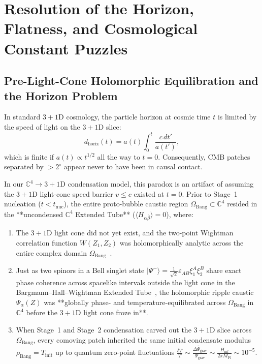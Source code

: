 \documentclass[11pt,a4paper]{article}
\begin{document}
\section{Resolution of the Horizon, Flatness, and Cosmological Constant Puzzles}

\subsection{Pre-Light-Cone Holomorphic Equilibration and the Horizon Problem}
In standard $3+1\text{D}$ cosmology, the particle horizon at cosmic time $t$ is limited by the speed of light on the $3+1\text{D}$ slice:
\begin{equation}
d_{\text{horiz}}(t) = a(t) \int_0^t \frac{c\, dt'}{a(t')},
\end{equation}
which is finite if $a(t) \propto t^{1/2}$ all the way to $t = 0$. Consequently, CMB patches separated by $> 2^\circ$ appear never to have been in causal contact.

In our $\mathbb{C}^4 \to 3+1\text{D}$ condensation model, this paradox is an artifact of assuming the $3+1\text{D}$ light-cone speed barrier $v \le c$ existed at $t = 0$. Prior to Stage~1 nucleation ($t < t_{\text{nuc}}$), the entire proto-bubble caustic region $\Omega_{\text{Bang}} \subset \mathbb{C}^4$ resided in the **uncondensed $\mathbb{C}^4$ Extended Tube** ($\langle H_{\alpha\bar{\beta}}\rangle = 0$), where:
\begin{enumerate}
    \item The $3+1\text{D}$ light cone did not yet exist, and the two-point Wightman correlation function $W(Z_1, Z_2)$ was holomorphically analytic across the entire complex domain $\Omega_{\text{Bang}}$~\cite{StreaterWightman1964}.
    \item Just as two spinors in a Bell singlet state $|\Psi^-\rangle = \frac{1}{\sqrt{2}}\varepsilon_{AB}\xi_1^A\xi_2^B$ share exact phase coherence across spacelike intervals outside the light cone in the Bargmann--Hall--Wightman Extended Tube~\cite{StreaterWightman1964,Bell1964}, the holomorphic ripple caustic $\Psi_\alpha(Z)$ was **globally phase- and temperature-equilibrated across $\Omega_{\text{Bang}}$ in $\mathbb{C}^4$ before the $3+1\text{D}$ light cone froze in**.
    \item When Stage~1 and Stage~2 condensation carved out the $3+1\text{D}$ slice across $\Omega_{\text{Bang}}$, every comoving patch inherited the same initial condensate modulus $\rho_{\text{Bang}} = T_{\text{init}}$ up to quantum zero-point fluctuations $\frac{\delta T}{T} \sim \frac{\Delta\hat{\Psi}_{\text{grav}}}{\Psi_{\text{grav}}} \sim \frac{H_{\text{inf}}}{2\pi M_{\text{Pl}}} \sim 10^{-5}$.
\end{enumerate}
\end{document}
